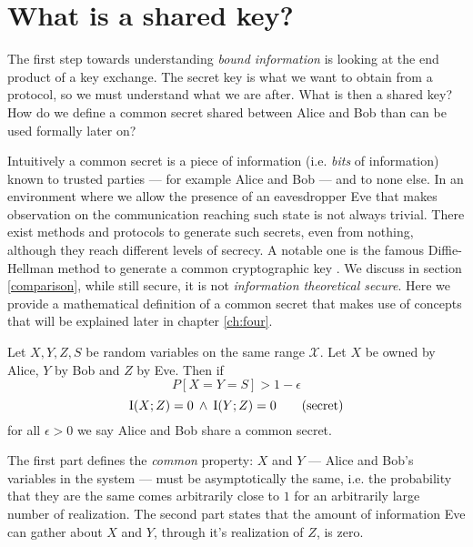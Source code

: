 \label{ch:two}
\section{What is a shared key?}
	The first step towards understanding \emph{bound information} is looking at the end product of a key exchange. 
	The secret key is what we want to obtain from a protocol, so we must understand what we are after.
	What is then a shared key? 
	How do we define a common secret shared between Alice and Bob than can be used formally later on? 
    	
Intuitively a common secret is a piece of information (i.e. \textit{bits} of information) known to trusted parties --- for example Alice and Bob --- and to none else. 
In an environment where we allow the presence of an eavesdropper Eve that makes observation on the communication reaching such state is not always trivial. 
There exist methods and protocols to generate such secrets, even from nothing, although they reach different levels of secrecy. A notable one is the famous Diffie-Hellman method to generate a common cryptographic key \cite{DH76} . 
We discuss in section \ref{comparison}, while still secure, it is not \textit{information theoretical secure}.
Here we provide a mathematical definition of a common secret that makes use of concepts that will be explained later in chapter \ref{ch:four}.
    	\begin{definition}
	Let $X,Y,Z,S$ be random variables on the same range $\mathcal{X}$. Let $X$ be owned by Alice, $Y$ by Bob and $Z$ by Eve. Then if
  \begin{equation} \label{eq:common}
	  P[X=Y=S] > 1 - \epsilon \tag{common}
	\end{equation}
	\begin{equation} \label{eq:secret}
	  \operatorname{I}(X;Z) = 0 \: \wedge \: \operatorname{I}(Y;Z) = 0 \tag{secret}
  \end{equation}
for all $\epsilon > 0 $ we say Alice and Bob share a common secret.
    	\end{definition}
The first part defines the \textit{common} property: $X$ and $Y$ --- Alice and Bob's variables in the system --- must be asymptotically the same, i.e. the probability that they are the same comes arbitrarily close to $1$ for an arbitrarily large number of realization.
The second part states that the amount of information Eve can gather about $X$ and $Y$, through it's realization of $Z$, is zero.
